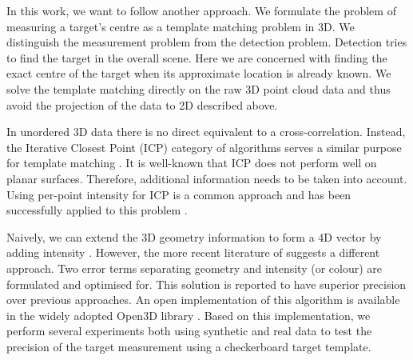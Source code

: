 In this work, we want to follow another approach. We formulate the problem of measuring a target's centre as a template matching problem in 3D. We distinguish the measurement problem from the detection problem. Detection tries to find the target in the overall scene. Here we are concerned with finding the exact centre of the target when its approximate location is already known. We solve the template matching directly on the raw 3D point cloud data and thus avoid the projection of the data to 2D described above. 

In unordered 3D data there is no direct equivalent to a cross-correlation. Instead, the Iterative Closest Point (ICP) category of algorithms serves a similar purpose for template matching \citep{besl_method_1992}. It is well-known that ICP does not perform well on planar surfaces. Therefore, additional information needs to be taken into account. Using per-point intensity for ICP is a common approach and has been successfully applied to this problem \citep{liang_fast_2024}. 

Naively, we can extend the 3D geometry information to form a 4D vector by adding intensity \citep{feldmar_extension_1997}. However, the more recent literature of \cite{park2017} suggests a different approach. Two error terms separating geometry and intensity (or colour) are formulated and optimised for. This solution is reported to have superior precision over previous approaches. An open implementation of this algorithm is available in the widely adopted Open3D library \citep{Zhou2018}. Based on this implementation, we perform several experiments both using synthetic and real data to test the precision of the target measurement using a checkerboard target template. 





